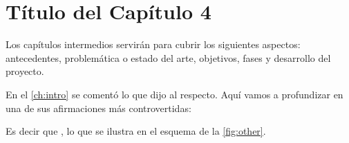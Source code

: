 \chapter{Título del Capítulo 4}
\label{ch:cuatro}

\noindent Los capítulos intermedios servirán para cubrir los siguientes aspectos: antecedentes, problemática o estado del arte, objetivos, fases y desarrollo del proyecto.

En el \autoref{ch:intro} se comentó lo que \cite{examplearticle} dijo al respecto. Aquí vamos a profundizar en una de sus afirmaciones más controvertidas:

\begin{displayquote}
\lipsum[7]
\end{displayquote}

Es decir que , lo que se ilustra en el esquema de la \autoref{fig:other}.

\lipsum[2]